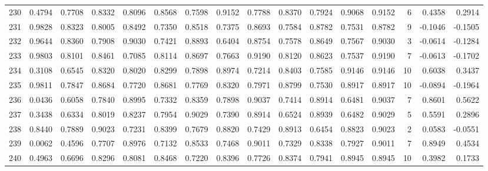 \begin{tabular}{lrrrrrrrrrrrrrrr}
230 &      0.4794 &  0.7708 &  0.8332 &  0.8096 &  0.8568 &  0.7598 &  0.9152 &  0.7788 &  0.8370 &  0.7924 &   0.9068 &     0.9152 &      6 &                    0.4358 &                     0.2914 \\
231 &      0.9828 &  0.8323 &  0.8005 &  0.8492 &  0.7350 &  0.8518 &  0.7375 &  0.8693 &  0.7584 &  0.8782 &   0.7531 &     0.8782 &      9 &                   -0.1046 &                    -0.1505 \\
232 &      0.9644 &  0.8360 &  0.7908 &  0.9030 &  0.7421 &  0.8893 &  0.6404 &  0.8754 &  0.7578 &  0.8649 &   0.7567 &     0.9030 &      3 &                   -0.0614 &                    -0.1284 \\
233 &      0.9803 &  0.8101 &  0.8461 &  0.7085 &  0.8114 &  0.8697 &  0.7663 &  0.9190 &  0.8120 &  0.8623 &   0.7537 &     0.9190 &      7 &                   -0.0613 &                    -0.1702 \\
234 &      0.3108 &  0.6545 &  0.8320 &  0.8020 &  0.8299 &  0.7898 &  0.8974 &  0.7214 &  0.8403 &  0.7585 &   0.9146 &     0.9146 &     10 &                    0.6038 &                     0.3437 \\
235 &      0.9811 &  0.7847 &  0.8684 &  0.7720 &  0.8681 &  0.7769 &  0.8320 &  0.7971 &  0.8799 &  0.7530 &   0.8917 &     0.8917 &     10 &                   -0.0894 &                    -0.1964 \\
236 &      0.0436 &  0.6058 &  0.7840 &  0.8995 &  0.7332 &  0.8359 &  0.7898 &  0.9037 &  0.7414 &  0.8914 &   0.6481 &     0.9037 &      7 &                    0.8601 &                     0.5622 \\
237 &      0.3438 &  0.6334 &  0.8019 &  0.8237 &  0.7954 &  0.9029 &  0.7390 &  0.8914 &  0.6524 &  0.8939 &   0.6482 &     0.9029 &      5 &                    0.5591 &                     0.2896 \\
238 &      0.8440 &  0.7889 &  0.9023 &  0.7231 &  0.8399 &  0.7679 &  0.8820 &  0.7429 &  0.8913 &  0.6454 &   0.8823 &     0.9023 &      2 &                    0.0583 &                    -0.0551 \\
239 &      0.0062 &  0.4596 &  0.7707 &  0.8976 &  0.7132 &  0.8533 &  0.7468 &  0.9011 &  0.7329 &  0.8338 &   0.7927 &     0.9011 &      7 &                    0.8949 &                     0.4534 \\
240 &      0.4963 &  0.6696 &  0.8296 &  0.8081 &  0.8468 &  0.7220 &  0.8396 &  0.7726 &  0.8374 &  0.7941 &   0.8945 &     0.8945 &     10 &                    0.3982 &                     0.1733 \\

\end{tabular}
